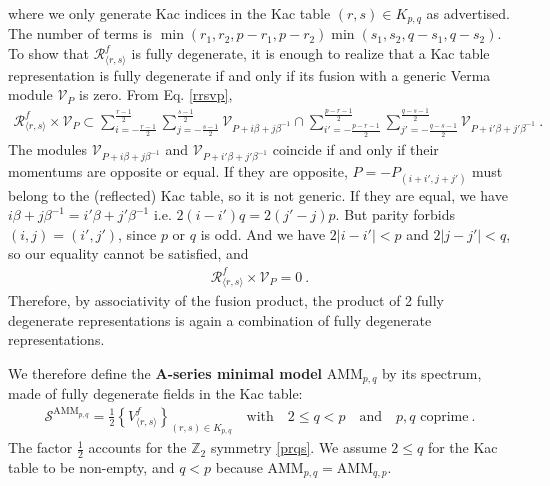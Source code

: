 \documentclass[12pt, a4paper]{article}
\newcommand{\myindex}[1]{\textbf{\boldmath #1}}
\begin{document}
where we only generate Kac indices in the Kac table $(r,s)\in K_{p,q}$ as advertised. The number of terms is $\min(r_1,r_2,p-r_1,p-r_2)\min(s_1,s_2,q-s_1,q-s_2)$. To show that $\mathcal{R}^f_{\langle r,s\rangle}$ is fully degenerate, it is enough to realize that a Kac table representation is fully degenerate if and only if its fusion with a generic Verma module $\mathcal{V}_P$ is zero. From Eq. \eqref{rrsvp}, 
\begin{align}
 \mathcal{R}^f_{\langle r,s\rangle}\times \mathcal{V}_P \subset \sum_{i=-\frac{r-1}{2}}^{\frac{r-1}{2}} \sum_{j=-\frac{s-1}{2}}^{\frac{s-1}{2}} \mathcal{V}_{P+i\beta +j\beta^{-1}} \cap \sum_{i'=-\frac{p-r-1}{2}}^{\frac{p-r-1}{2}} \sum_{j'=-\frac{q-s-1}{2}}^{\frac{q-s-1}{2}} \mathcal{V}_{P+i'\beta +j'\beta^{-1}}\ .
\end{align}
The modules $\mathcal{V}_{P+i\beta +j\beta^{-1}}$ and $\mathcal{V}_{P+i'\beta +j'\beta^{-1}}$ coincide if and only if their momentums are opposite or equal. If they are opposite, $P=-P_{(i+i',j+j')}$ must belong to the (reflected) Kac table, so it is not generic. If they are equal, we have $i\beta +j\beta^{-1} = i'\beta +j'\beta^{-1}$ i.e. $2(i-i')q = 2(j'-j)p$. 
But parity forbids $(i,j)=(i',j')$, since $p$ or $q$ is odd. And we have $2|i-i'|<p$ and $2|j-j'|<q$, so our equality cannot be satisfied, and 
\begin{align}
 \mathcal{R}^f_{\langle r,s\rangle}\times \mathcal{V}_P = 0 \ . 
\end{align}
Therefore, by associativity of the fusion product, the product of 2 fully degenerate representations is again a combination of fully degenerate representations.

We therefore define the \myindex{A-series minimal model} AMM$_{p,q}$ by its spectrum, made of fully degenerate fields in the Kac table:
\begin{align}
 \boxed{\mathcal{S}^{\text{AMM}_{p,q}} = \frac12\left\{ V^f_{\langle r,s\rangle} \right\}_{(r,s)\in K_{p,q}} \quad \text{with} \quad 2\leq q<p \quad \text{and} \quad p, q \text{ coprime}}\ .
 \label{samm}
\end{align}
The factor $\frac12$ accounts for the $\mathbb{Z}_2$ symmetry \eqref{prqs}. We assume $2\leq q$ for the Kac table to be non-empty, and 
$q<p$ because AMM$_{p, q}=$AMM$_{q,p}$.
\end{document}
